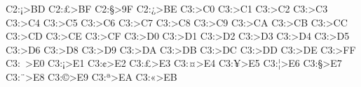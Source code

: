 \def\reassignquotnewlig#1#2#3{\catcode#1=13 \begingroup\lccode`\~=#1 \lowercase{\endgroup\def~}##1{\let\c=##1\ifnum`##1=#1#3\else#2##1\fi}}
\def\reassignquot#1#2{\catcode#1=13 \begingroup\lccode`\~=#1 \lowercase{\endgroup\def~}{#2}}
\def\germanquot{\reassignquotnewlig{`\`}{\quotedsinglbase}{\quotedblbase}\reassignquot{`\'}{\textquoteleft}}
\def\guillemetquot{\reassignquotnewlig{`\`}{\guilsinglleft}{\guillemotleft}\reassignquotnewlig{`\'}{\guilsinglright}{\guillemotright}} %


\newutfenc C2:^^a1>BD%
\newutfenc C2:^^a3>BF%
\newutfenc C2:^^a7>9F%
\newutfenc C2:^^bf>BE%
\newutfenc C3:^^80>C0%
\newutfenc C3:^^81>C1%
\newutfenc C3:^^82>C2%
\newutfenc C3:^^83>C3%
\newutfenc C3:^^84>C4%
\newutfenc C3:^^85>C5%
\newutfenc C3:^^86>C6%
\newutfenc C3:^^87>C7%
\newutfenc C3:^^88>C8%
\newutfenc C3:^^89>C9%
\newutfenc C3:^^8a>CA%
\newutfenc C3:^^8b>CB%
\newutfenc C3:^^8c>CC%
\newutfenc C3:^^8d>CD%
\newutfenc C3:^^8e>CE%
\newutfenc C3:^^8f>CF%
\newutfenc C3:^^90>D0%
\newutfenc C3:^^91>D1%
\newutfenc C3:^^92>D2%
\newutfenc C3:^^93>D3%
\newutfenc C3:^^94>D4%
\newutfenc C3:^^95>D5%
\newutfenc C3:^^96>D6%
\newutfenc C3:^^98>D8%
\newutfenc C3:^^99>D9%
\newutfenc C3:^^9a>DA%
\newutfenc C3:^^9b>DB%
\newutfenc C3:^^9c>DC%
\newutfenc C3:^^9d>DD%
\newutfenc C3:^^9e>DE%
\newutfenc C3:^^9f>FF%
\newutfenc C3:^^a0>E0%
\newutfenc C3:^^a1>E1%
\newutfenc C3:^^a2>E2%
\newutfenc C3:^^a3>E3%
\newutfenc C3:^^a4>E4%
\newutfenc C3:^^a5>E5%
\newutfenc C3:^^a6>E6%
\newutfenc C3:^^a7>E7%
\newutfenc C3:^^a8>E8%
\newutfenc C3:^^a9>E9%
\newutfenc C3:^^aa>EA%
\newutfenc C3:^^ab>EB%

